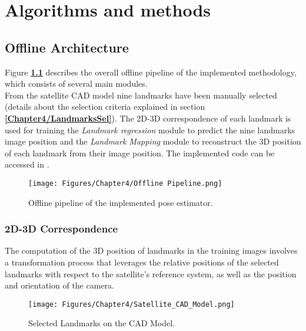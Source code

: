 
\chapter{Algorithms and methods} %

\label{Chapter4} %


\section{Offline Architecture}
Figure \textbf{\ref{fig:Offline Pipeline}} describes the overall offline pipeline of the implemented methodology, which consists of several main modules.\\
From the satellite CAD model nine landmarks have been manually selected (details about the selection criteria explained in section \textbf{\ref{Chapter4/LandmarksSel}}). The 2D-3D correspondence of each landmark is used for training the \textit{Landmark regression} module to predict the nine landmarks image position and the \textit{Landmark Mapping} module to reconstruct the 3D position of each landmark from their image position.
The implemented code can be accessed in \cite{JMF}.

\begin{figure}[th]
    \centering
    \texttt{[image: Figures/Chapter4/Offline Pipeline.png]}
    \caption[Offline pipeline]{Offline pipeline of the implemented pose estimator.}
    \label{fig:Offline Pipeline}
\end{figure}
\subsection{2D-3D Correspondence}
\label{Chapter4/2D-3D}
The computation of the 3D position of landmarks in the training images involves a transformation process that leverages the relative positions of the selected landmarks with respect to the satellite's reference system, as well as the position and orientation of the camera.

\begin{figure}[th]
    \centering
    \texttt{[image: Figures/Chapter4/Satellite\_CAD\_Model.png]}
    \caption[CAD Model]{Selected Landmarks on the CAD Model.}
    \label{fig:CAD Model}
\end{figure}

